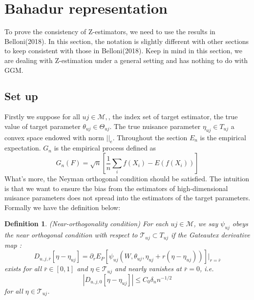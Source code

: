 \documentclass{article}
\newtheorem{definition}[theorem]{Definition}
\begin{document}
\section{Bahadur representation}
To prove the consistency of Z-estimators, we need to use the results in Belloni(2018)\cite{Belloni_2018}. In this section, the notation is slightly different with other sections to keep consistent with those in Belloni(2018). Keep in mind in this section, we are dealing with Z-estimation under a general setting and has nothing to do with GGM.
\subsection{Set up}
Firstly we suppose for all $uj\in \mathcal{M},$, the index set of target estimator, the true value of target parameter $\theta_{uj}\in \Theta_{uj}$. The true nuisance parameter $\eta_{uj}\in T_{uj}$ a convex space endowed with norm $||_e$.  
Throughout the section $E_n$ is the empirical expectation. $G_n$ is the empirical process defined as 
\begin{equation}
    G_n(F)=\sqrt{n}[\frac{1}{n}\sum_i f(X_i)-E(f(X_i))]
\end{equation}
What's more, the Neyman orthogonal condition should be satisfied. The intuition is that we want to ensure the bias from the estimators of high-dimensional nuisance parameters does not spread into the estimators of the target parameters. Formally we have the definition below:
\begin{definition}{(Near-orthogonality condition)}
    For each $uj\in \mathcal{M}$, we say $\psi_{uj}$ obeys the near orthogonal condition with respect to $\mathcal{T}_{uj}\subset T_{uj}$ if the Gateautex derivative map :
    \begin{equation}
        D_{u,j,\bar{r}}[\eta-\eta_{uj}]=\partial_r E_P[\psi_{uj}(W,\theta_{uj},\eta_{uj}+r(\eta-\eta_{uj}))]|_{r=\bar{r}}
    \end{equation}
    exists for all $\bar{r}\in [0,1]$ and $\eta\in \mathcal{T}_{uj}$ and nearly vanishes at $\bar{r}=0$, i.e.
    \begin{equation}
        |D_{u,j,0}[\eta-\eta_{uj}]|\leq C_0\delta_n n^{-1/2}
    \end{equation}
    for all $\eta\in \mathcal{T}_{uj}$.
\end{definition}
\end{document}
